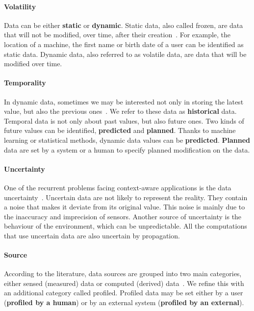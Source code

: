 \paragraph{Volatility}
Data can be either \textbf{static} or \textbf{dynamic}.
Static data, also called frozen, are data that will not be modified, over time, after their creation~\cite{DBLP:conf/pervasive/HenricksenIR02, DBLP:journals/comsur/MakrisSS13, DBLP:journals/percom/BettiniBHINRR10}.
For example, the location of a machine, the first name or birth date of a user can be identified as static data. 
Dynamic data, also referred to as volatile data, are data that will be modified over time.

\paragraph{Temporality}
In dynamic data, sometimes we may be interested not only in storing the latest value, but also the previous ones~\cite{DBLP:conf/seke/0001FNMKT14, DBLP:conf/pervasive/HenricksenIR02}. 
We refer to these data as \textbf{historical} data.
Temporal data is not only about past values, but also future ones. 
Two kinds of future values can be identified, \textbf{predicted} and \textbf{planned}.  
Thanks to machine learning or statistical methods, dynamic data values can be \textbf{predicted}. 
\textbf{Planned} data are set by a system or a human to specify planned modification on the data.

\paragraph{Uncertainty}
One of the recurrent problems facing context-aware applications is the data uncertainty~\cite{DBLP:conf/dagstuhl/LemosGMSALSTVVWBBBBCDDEGGGGIKKLMMMMMNPPSSSSTWW10, DBLP:conf/pervasive/HenricksenIR02, DBLP:journals/comsur/MakrisSS13, DBLP:journals/percom/BettiniBHINRR10}.
Uncertain data are not likely to represent the reality. They contain a noise that makes it deviate from its original value.
This noise is mainly due to the inaccuracy and imprecision of sensors.
Another source of uncertainty is the behaviour of the environment, which can be unpredictable.
All the computations that use uncertain data are also uncertain by propagation.

\paragraph{Source}
According to the literature, data sources are grouped into two main categories, either sensed (measured) data or computed (derived) \linebreak data~\cite{DBLP:journals/comsur/PereraZCG14}.
We refine this with an additional category called profiled.
Profiled data may be set either by a user (\textbf{profiled by a human}) or by an external system (\textbf{profiled by an external}).

